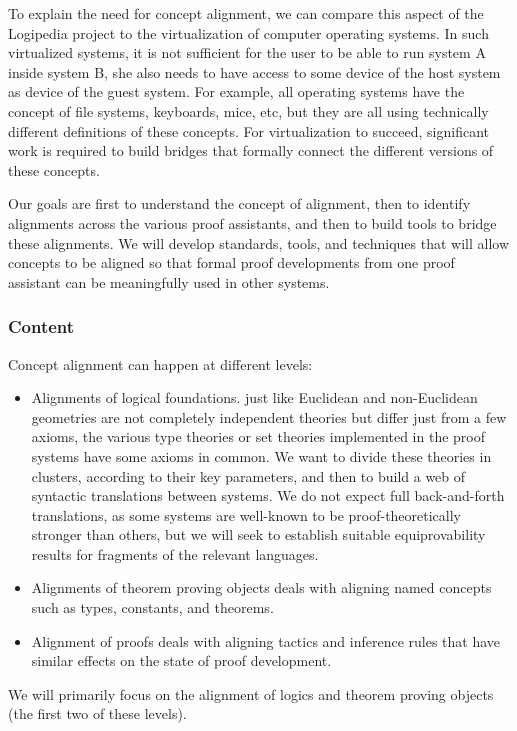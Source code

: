 To explain the need for concept alignment, we can compare this aspect
of the Logipedia project to the virtualization of computer operating
systems. In such virtualized systems, it is not sufficient for the
user to be able to run system A inside system B, she also needs to
have access to some device of the host system as device of the guest
system. For example, all operating systems have the concept of file
systems, keyboards, mice, etc, but they are all using technically
different definitions of these concepts.  For virtualization to
succeed, significant work is required to build bridges that formally
connect the different versions of these concepts.

Our goals are first to understand the concept of
alignment, then to identify alignments across the various proof
assistants, and then to build tools to bridge these alignments. We
will develop standards, tools, and techniques that will allow concepts
to be aligned so that formal proof developments from one proof
assistant can be meaningfully used in other systems.

\subsubsection*{Content}

Concept alignment can happen at different levels:
\begin{itemize}
\item Alignments of logical foundations. just like Euclidean and
  non-Euclidean geometries are not completely independent theories but
  differ just from a few axioms, the various type theories or set theories 
implemented in the proof systems have some axioms in common. 
We want to divide these theories in clusters,
according to their key parameters, and then to build a
web of syntactic translations between systems. We do not expect full
back-and-forth translations, as some systems are well-known to be
proof-theoretically stronger than others, but we will seek to
establish suitable equiprovability results for fragments of the
relevant languages.

\item Alignments of theorem proving objects deals with aligning named concepts such as types,
  constants, and theorems.
\item Alignment of proofs deals with aligning tactics and
  inference rules that have similar effects on the state of proof
  development.
\end{itemize}
We will primarily focus on the alignment of
logics and theorem proving objects (the first two of these levels).

